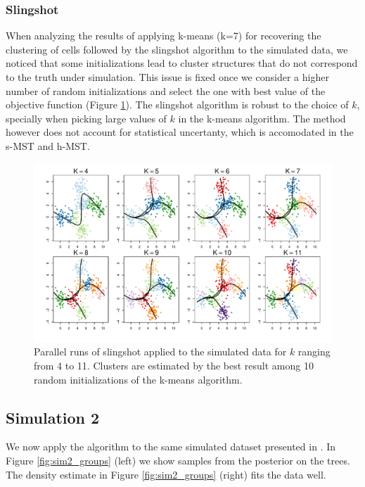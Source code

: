 \subsubsection*{Slingshot}

When analyzing the results of applying k-means (k=7) for recovering the clustering of cells followed by the slingshot algorithm to the simulated data, we noticed that some initializations lead to cluster structures that do not correspond to the truth under simulation. This issue is fixed once we consider a higher number of random initializations and select the one with best value of the objective function (Figure \ref{fig:sim1_slingshot_multipleK}). The slingshot algorithm is robust to the choice of $k$, specially when picking large values of $k$ in the k-means algorithm. The method however does not account for statistical uncertanty, which is accomodated in the s-MST and h-MST.

\begin{figure}[H]
  \centering
  \includegraphics[scale = 0.5]{Img/Simulated/slinghot_sim_1_multipleK_2.pdf}
\caption{Parallel runs of slingshot applied to the simulated data for $k$ ranging from 4 to 11. Clusters are estimated by the best result among 10 random initializations of the k-means algorithm.}
\label{fig:sim1_slingshot_multipleK}
\end{figure}


\subsection{Simulation 2}

We now apply the algorithm to the same simulated dataset presented in
\cite{street2018}.  In Figure \ref{fig:sim2_groups} (left) we show samples from
the posterior on the trees. The density estimate in Figure
\ref{fig:sim2_groups} (right) fits the data well.


